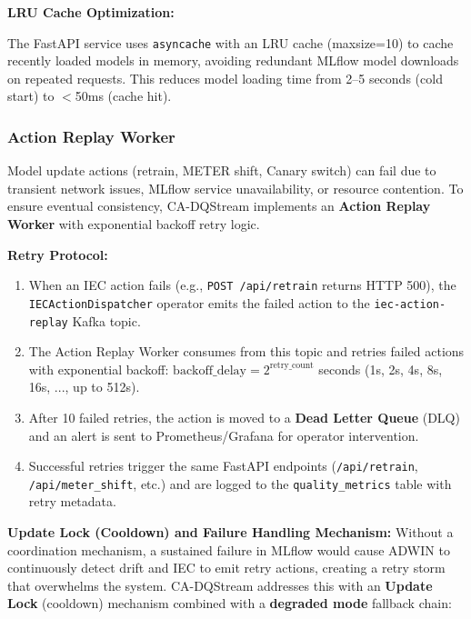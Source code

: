 \textbf{LRU Cache Optimization:}

The FastAPI service uses \texttt{asyncache} with an LRU cache (maxsize=10) to cache recently loaded models in memory, avoiding redundant MLflow model downloads on repeated requests. This reduces model loading time from 2--5 seconds (cold start) to $<$50ms (cache hit).

\subsubsection{Action Replay Worker}

Model update actions (retrain, METER shift, Canary switch) can fail due to transient network issues, MLflow service unavailability, or resource contention. To ensure eventual consistency, CA-DQStream implements an \textbf{Action Replay Worker} with exponential backoff retry logic.

\textbf{Retry Protocol:}

\begin{enumerate}
    \item When an IEC action fails (e.g., \texttt{POST /api/retrain} returns HTTP 500), the \texttt{IECActionDispatcher} operator emits the failed action to the \texttt{iec-action-replay} Kafka topic.

    \item The Action Replay Worker consumes from this topic and retries failed actions with exponential backoff: $\text{backoff\_delay} = 2^{\text{retry\_count}}$ seconds (1s, 2s, 4s, 8s, 16s, ..., up to 512s).

    \item After 10 failed retries, the action is moved to a \textbf{Dead Letter Queue} (DLQ) and an alert is sent to Prometheus/Grafana for operator intervention.

    \item Successful retries trigger the same FastAPI endpoints (\texttt{/api/retrain}, \texttt{/api/meter\_shift}, etc.) and are logged to the \texttt{quality\_metrics} table with retry metadata.
\end{enumerate}

\textbf{Update Lock (Cooldown) and Failure Handling Mechanism:} Without a coordination mechanism, a sustained failure in MLflow would cause ADWIN to continuously detect drift and IEC to emit retry actions, creating a retry storm that overwhelms the system. CA-DQStream addresses this with an \textbf{Update Lock} (cooldown) mechanism combined with a \textbf{degraded mode} fallback chain:

